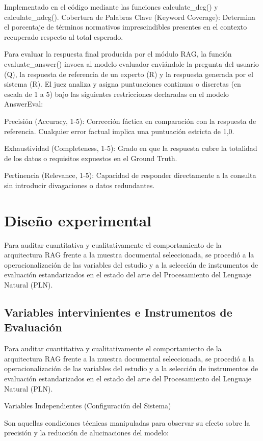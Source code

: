 Implementado en el código mediante las funciones calculate\_dcg() y calculate\_ndcg(). Cobertura de Palabras Clave (Keyword Coverage): Determina el porcentaje de términos normativos imprescindibles presentes en el contexto recuperado respecto al total esperado.

Para evaluar la respuesta final producida por el módulo RAG, la función evaluate\_answer() invoca al modelo evaluador enviándole la pregunta del usuario (Q), la respuesta de referencia de un experto (R) y la respuesta generada por el sistema (R). El juez analiza y asigna puntuaciones continuas o discretas (en escala de 1 a 5) bajo las siguientes restricciones declaradas en el modelo AnswerEval:

Precisión (Accuracy, 1-5): Corrección fáctica en comparación con la respuesta de referencia. Cualquier error factual implica una puntuación estricta de 1,0.

Exhaustividad (Completeness, 1-5): Grado en que la respuesta cubre la totalidad de los datos o requisitos expuestos en el Ground Truth.

Pertinencia (Relevance, 1-5): Capacidad de responder directamente a la consulta sin introducir divagaciones o datos redundantes.

\section{Diseño experimental}
Para auditar cuantitativa y cualitativamente el comportamiento de la arquitectura RAG frente a la muestra documental seleccionada, se procedió a la operacionalización de las variables del estudio y a la selección de instrumentos de evaluación estandarizados en el estado del arte del Procesamiento del Lenguaje Natural (PLN).

\subsection{Variables intervinientes e Instrumentos de Evaluación}
Para auditar cuantitativa y cualitativamente el comportamiento de la arquitectura RAG frente a la muestra documental seleccionada, se procedió a la operacionalización de las variables del estudio y a la selección de instrumentos de evaluación estandarizados en el estado del arte del Procesamiento del Lenguaje Natural (PLN).

Variables Independientes (Configuración del Sistema)

Son aquellas condiciones técnicas manipuladas para observar su efecto sobre la precisión y la reducción de alucinaciones del modelo:

